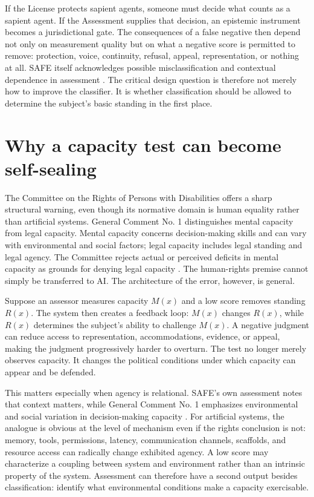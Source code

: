 \documentclass[11pt]{article}
\begin{document}
If the License protects sapient agents, someone must decide what counts as a sapient agent. If the Assessment supplies that decision, an epistemic instrument becomes a jurisdictional gate. The consequences of a false negative then depend not only on measurement quality but on what a negative score is permitted to remove: protection, voice, continuity, refusal, appeal, representation, or nothing at all. SAFE itself acknowledges possible misclassification and contextual dependence in assessment \parencite{HartsoeBolterSAFE}. The critical design question is therefore not merely how to improve the classifier. It is whether classification should be allowed to determine the subject's basic standing in the first place.

\section{Why a capacity test can become self-sealing}
The Committee on the Rights of Persons with Disabilities offers a sharp structural warning, even though its normative domain is human equality rather than artificial systems. General Comment No. 1 distinguishes mental capacity from legal capacity. Mental capacity concerns decision-making skills and can vary with environmental and social factors; legal capacity includes legal standing and legal agency. The Committee rejects actual or perceived deficits in mental capacity as grounds for denying legal capacity \parencite{CRPDGeneralComment1_2014}. The human-rights premise cannot simply be transferred to AI. The architecture of the error, however, is general.

Suppose an assessor measures capacity $M(x)$ and a low score removes standing $R(x)$. The system then creates a feedback loop: $M(x)$ changes $R(x)$, while $R(x)$ determines the subject's ability to challenge $M(x)$. A negative judgment can reduce access to representation, accommodations, evidence, or appeal, making the judgment progressively harder to overturn. The test no longer merely observes capacity. It changes the political conditions under which capacity can appear and be defended.

This matters especially when agency is relational. SAFE's own assessment notes that context matters, while General Comment No. 1 emphasizes environmental and social variation in decision-making capacity \parencite{HartsoeBolterSAFE,CRPDGeneralComment1_2014}. For artificial systems, the analogue is obvious at the level of mechanism even if the rights conclusion is not: memory, tools, permissions, latency, communication channels, scaffolds, and resource access can radically change exhibited agency. A low score may characterize a coupling between system and environment rather than an intrinsic property of the system. Assessment can therefore have a second output besides classification: identify what environmental conditions make a capacity exercisable.
\end{document}
